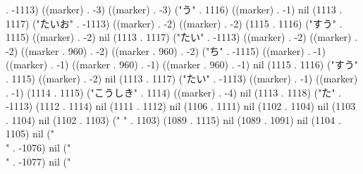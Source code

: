 . -1113) ((marker) . -3) ((marker) . -3) ("う" . 1116) ((marker) . -1) nil (1113 . 1117) ("たいお" . -1113) ((marker) . -2) ((marker) . -2) (1115 . 1116) ("すう" . 1115) ((marker) . -2) nil (1113 . 1117) ("たい" . -1113) ((marker) . -2) ((marker) . -2) ((marker . 960) . -2) ((marker . 960) . -2) ("ち" . -1115) ((marker) . -1) ((marker) . -1) ((marker . 960) . -1) ((marker . 960) . -1) nil (1115 . 1116) ("すう" . 1115) ((marker) . -2) nil (1113 . 1117) ("たい" . -1113) ((marker) . -1) ((marker) . -1) (1114 . 1115) ("こうしき" . 1114) ((marker) . -4) nil (1113 . 1118) ("た" . -1113) (1112 . 1114) nil (1111 . 1112) nil (1106 . 1111) nil (1102 . 1104) nil (1103 . 1104) nil (1102 . 1103) (" " . 1103) (1089 . 1115) nil (1089 . 1091) nil (1104 . 1105) nil ("\\" . -1076) nil ("\\" . -1077) nil ("
